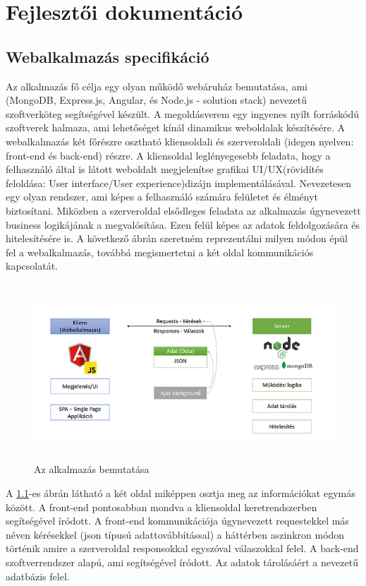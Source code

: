 \chapter{Fejlesztői dokumentáció}
\label{ch:impl}

\section{Webalkalmazás specifikáció}
Az alkalmazás fő célja egy olyan működő webáruház bemutatása, ami \citeauthor{MEAN} (MongoDB, Express.js, Angular, és Node.js - solution stack) nevezetű szoftverköteg segítségével készült. A \citeauthor{MEAN}  megoldásverem egy ingyenes nyílt forráskódú szoftverek halmaza, ami lehetőséget kínál dinamikus weboldalak készítésére. A webalkalmazás két főrészre osztható kliensoldali és szerveroldali (idegen nyelven: front-end és back-end) részre. A kliensoldal leglényegesebb feladata, hogy a felhasználó által is látott weboldalt megjelenítse grafikai UI/UX(rövidítés feloldása: User interface/User experience)dizájn implementálásával. Nevezetesen egy olyan rendszer, ami képes a felhasználó számára felületet és élményt biztosítani. Miközben a szerveroldal elsődleges feladata az alkalmazás úgynevezett business logikájának a megvalósítása. Ezen felül képes az adatok feldolgozására és hitelesítésére is. A következő ábrán szeretném reprezentálni milyen módon épül fel a webalkalmazás, továbbá megismertetni a két oldal kommunikációs kapcsolatát.

\begin{figure}[H]
	\centering
	\includegraphics[width=1.0\textwidth,height=250px]{images/alkalmazas_bemutatasa.png}
	\caption{Az alkalmazás bemutatása}
	\label{fig.picture-1}
\end{figure}

A \ref{fig.picture-1}-es ábrán látható a két oldal miképpen osztja meg az információkat egymás között. A front-end pontosabban mondva a kliensoldal \citeauthor{Angular} keretrendszerben \citeauthor{TypeScript} segítségével íródott. A front-end kommunikációja úgynevezett requestekkel más néven kérésekkel (json típusú adattovábbítással) a háttérben aszinkron módon történik amire a szerveroldal responsokkal egyszóval válaszokkal felel. A back-end \citeauthor{Node.js} szoftverrendszer alapú, ami \citeauthor{Express} segítségével íródott. Az adatok tárolásáért a \citeauthor{MongoDB} nevezetű adatbázis felel.

